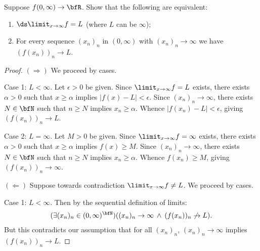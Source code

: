 \documentclass[11pt,twoside,openany]{memoir}
\begin{document}
    \addtocounter{exercise}{1}
    \begin{exercise}
        Suppose $f(0,\infty) \rightarrow \bfR$. Show that the following are equivalent:
            \begin{enumerate}[label = (\roman*)]
                \item $\ds \limit_{x \rightarrow \infty}f = L$ (where $L$ can be $\infty$);
                \item For every sequence $(x_n)_n$ in $(0,\infty)$ with $(x_n)_n \rightarrow \infty$ we have $(f(x_n))_n \rightarrow L$.
            \end{enumerate}
    \end{exercise}
        \begin{proof}
            $(\Rightarrow)$ We proceed by cases. \nl
            
            Case 1: $L < \infty$. Let $\epsilon > 0$ be given. Since $\limit_{x \rightarrow \infty}f = L$ exists, there exists $\alpha > 0$ such that $x \geq \alpha$ implies $|f(x) - L| < \epsilon$. Since $(x_n)_n \rightarrow \infty$, there exists $N \in \bfN$ such that $n \geq N$ implies $x_n \geq \alpha$. Whence $|f(x_n)- L|<\epsilon$, giving $(f(x_n))_n \rightarrow L$. \nl
            
            Case 2: $L = \infty$. Let $M > 0$ be given. Since $\limit_{x \rightarrow \infty}f = \infty$ exists, there exists $\alpha > 0$ such that $x \geq \alpha$ implies $f(x) \geq M$. Since $(x_n)_n \rightarrow \infty$, there exists $N \in \bfN$ such that $n \geq N$ implies $x_n \geq \alpha$. Whence $f(x_n) \geq M$, giving $(f(x_n))_n \rightarrow \infty$. \nl
            
            $(\Leftarrow)$ Suppose towards contradiction $\limit_{x \rightarrow \infty}f \neq L $. We proceed by cases. \nl
            
            Case 1: $L < \infty$. Then by the sequential definition of limits:
                \begin{equation*}
                \begin{split}
                    (\exists (x_n)_n \in (0,\infty)^\bfN)((x_n)_n \rightarrow \infty \hspace{2pt}\land\hspace{2pt}(f(x_n))_n \not\rightarrow L).
                \end{split}
                \end{equation*}
            But this contradicts our assumption that for all $(x_n)_n$, $(x_n)_n \rightarrow \infty$ implies $(f(x_n))_n \rightarrow L$. \nl
            

\end{proof}
\end{document}
